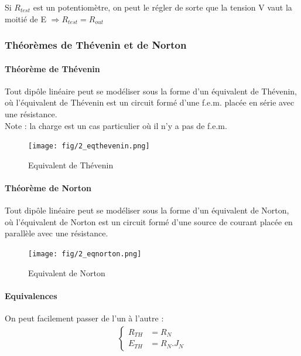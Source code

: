 \documentclass[a4paper]{article}
\begin{document}
    Si $R_{test}$ est un potentiomètre, on peut le régler de sorte que la tension
    V vaut la moitié de E $\Rightarrow R_{test} = R_{out}$

    \subsubsection{Théorèmes de Thévenin et de Norton}

    \paragraph{Théorème de Thévenin} Tout dipôle linéaire peut se modéliser
    sous la forme d'un équivalent de Thévenin, où l'équivalent de Thévenin
    est un circuit formé d'une f.e.m. placée en série avec une résistance.\\

    Note : la charge est un cas particulier où il n'y a pas de f.e.m.

    \begin{figure}[H]
        \begin{center}
            \texttt{[image: fig/2\_eqthevenin.png]}
            \caption{Equivalent de Thévenin}
            \label{fig:2_eqthevenin}
        \end{center}
    \end{figure}

    \paragraph{Théorème de Norton} Tout dipôle linéaire peut se modéliser
    sous la forme d'un équivalent de Norton, où l'équivalent de Norton
    est un circuit formé d'une source de courant placée en parallèle avec une résistance.

    \begin{figure}[H]
        \begin{center}
            \texttt{[image: fig/2\_eqnorton.png]}
            \caption{Equivalent de Norton}
            \label{fig:2_eqnorton}
        \end{center}
    \end{figure}

    \paragraph{Equivalences} On peut facilement passer de l'un à l'autre :
    \begin{align*}
        \begin{cases}
            R_{TH}&= R_N\\
            E_{TH}&= R_N . J_N
        \end{cases}
    \end{align*}
\end{document}
